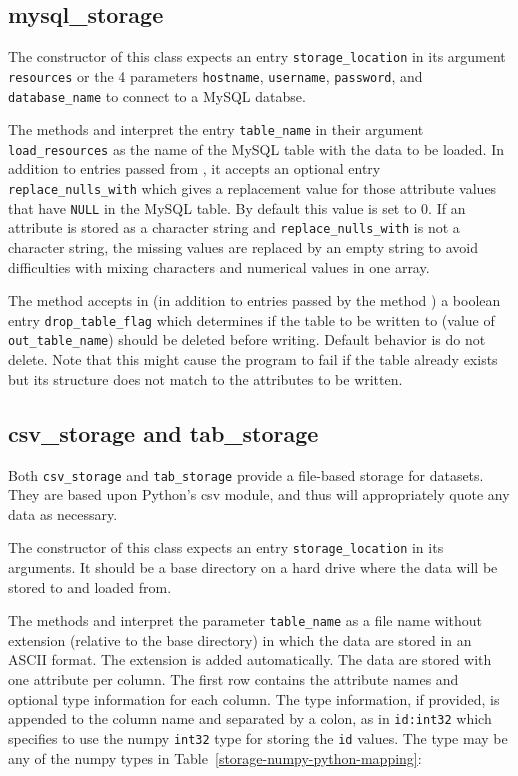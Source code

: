 {\subsection{mysql_storage}
\label{sec:mysql-storage}
%
The constructor of this class expects an entry \verb|storage_location| in its
argument \verb|resources| or the 4 parameters \verb|hostname|, \verb|username|,
\verb|password|, and \verb|database_name| to connect to a MySQL databse.

The methods  \datasetindex and 
interpret the entry \verb|table_name| in their argument \verb|load_resources|
as the name of the MySQL table with the data to be loaded. In addition to
entries passed from , \datasetindex it accepts an optional entry \verb|replace_nulls_with|
which gives a replacement value for those attribute values that have \verb|NULL| in
the MySQL table. By default this value is set to 0. If an attribute
is stored as a character string and \verb|replace_nulls_with| is not a character string,
the missing values are replaced by an empty string to avoid difficulties
with mixing characters and numerical values in one array.

The method  accepts in  (in
addition to entries passed by the  method
) \datasetindex a boolean entry \verb|drop_table_flag| which
determines if the table to be written to (value of \verb|out_table_name|)
should be deleted before writing. Default behavior is do not delete. Note
that this might cause the program to fail if the table already exists but its
structure does not match to the attributes to be written.

\subsection{csv_storage and tab_storage}
%
Both \verb|csv_storage| and \verb|tab_storage| provide a file-based storage for
datasets.  They are based upon Python's csv module, and thus will appropriately
quote any data as necessary.

The constructor of this class expects an entry \verb|storage_location| in its
arguments. It should be a base directory on a hard drive where
the data will be stored to and loaded from.

The methods  and 
interpret the parameter  \verb|table_name| as a file
name without extension (relative to the base directory) in which the data are
stored in an ASCII format. The extension is added automatically. The data are
stored with one attribute per column. The first row
contains the attribute names and optional type information for each column.
The type information, if provided, is appended to the column name and separated
by a colon, as in \verb|id:int32| which specifies to use the numpy
\verb|int32| type for storing the \verb|id| values.  The type may be any of the
numpy types in Table~\ref{storage-numpy-python-mapping}:

}
